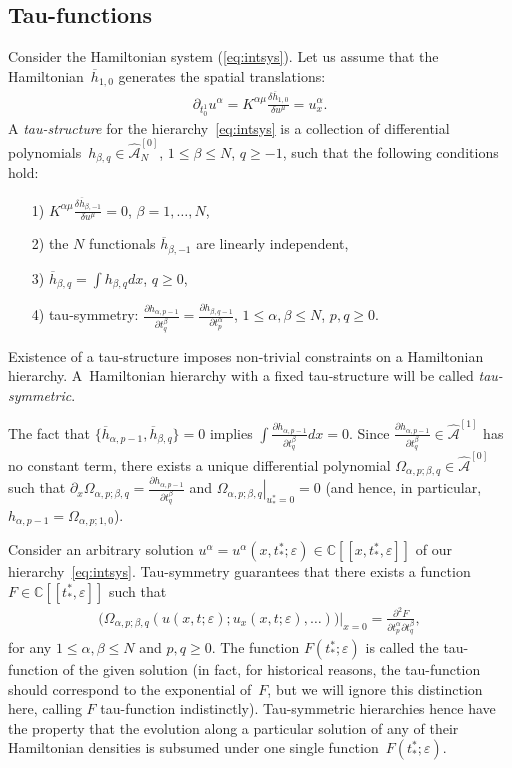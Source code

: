 \documentclass[pdftex]{sigma}
\numberwithin{equation}{section}
\newcommand{\mbC}{\mathbb C}
\newcommand{\oh}{\overline h}
\def\d{{\partial}}
\newcommand{\<}{\left<}
\renewcommand{\>}{\right>}
\newcommand{\eps}{\varepsilon}
\newcommand{\hcA}{\widehat{\mathcal A}}
\begin{document}
\subsection{Tau-functions}\label{section:tau} Consider the Hamiltonian system (\ref{eq:intsys}). Let us assume that the Hamiltonian~$\oh_{1,0}$ generates the spatial translations:
\begin{gather*}
\d_{t^1_0}u^\alpha=K^{\alpha\mu}\frac{\delta\oh_{1,0}}{\delta u^\mu}=u^\alpha_x.
\end{gather*}
A {\it tau-structure} for the hierarchy~\eqref{eq:intsys} is a collection of dif\/ferential polynomials~$h_{\beta,q}\in\hcA^{[0]}_N$, $1\le\beta\le N$, $q\ge -1$, such that the following conditions hold:
\begin{enumerate}\itemsep=0pt
\item[1)] $K^{\alpha\mu}\frac{\delta\oh_{\beta,-1}}{\delta u^\mu}=0$, $\beta=1,\dots,N$,

\item[2)] the $N$ functionals $\oh_{\beta,-1}$ are linearly independent,

\item[3)] $\oh_{\beta,q}=\int h_{\beta,q}dx$, $q\ge 0$,

\item[4)] tau-symmetry:
$\frac{\d h_{\alpha,p-1}}{\d t^\beta_q}=\frac{\d h_{\beta,q-1}}{\d t^\alpha_p}$, $1\le\alpha,\beta\le N$, $p,q\ge 0$.
\end{enumerate}

Existence of a tau-structure imposes non-trivial constraints on a Hamiltonian hierarchy. A~Hamiltonian hierarchy with a f\/ixed tau-structure will be called {\it tau-symmetric}.

The fact that $\{\oh_{\alpha,p-1},\oh_{\beta,q}\}=0$ implies $\int\frac{\d h_{\alpha,p-1}}{\d t^\beta_q}dx=0$. Since $\frac{\d h_{\alpha,p-1}}{\d t^\beta_q} \in \hcA^{[1]}$ has no constant term, there exists a unique dif\/ferential polynomial $\Omega_{\alpha,p;\beta,q}\in\hcA^{[0]}$ such that $\d_x \Omega_{\alpha,p;\beta,q} = \frac{\d h_{\alpha,p-1}}{\d t^\beta_q}$ and $\left.\Omega_{\alpha,p;\beta,q}\right|_{u^*_*=0} = 0$ (and hence, in particular, $h_{\alpha,p-1} = \Omega_{\alpha,p;1,0}$).

Consider an arbitrary solution $u^\alpha=u^\alpha(x,t^*_*;\eps)\in\mbC[[x,t^*_*,\eps]]$ of our hierarchy~\eqref{eq:intsys}. Tau-symmetry guarantees that there exists a function $F\in\mbC[[t^*_*,\eps]]$ such that
\begin{gather*}
\big(\Omega_{\alpha,p;\beta,q}(u(x,t;\eps);u_x(x,t;\eps),\dots)\big)\big|_{x=0}=\frac{\d^2 F}{\d t^\alpha_p\d t^\beta_q},
\end{gather*} for any $1\le\alpha,\beta\le N$ and $p,q\ge 0$. The function $F(t^*_*;\eps)$ is called the tau-function of the given solution (in fact, for historical reasons, the tau-function should correspond to the exponential of~$F$, but we will ignore this distinction here, calling $F$ tau-function indistinctly). Tau-symmetric hierarchies hence have the property that the evolution along a particular solution of any of their Hamiltonian densities is subsumed under one single function~$F(t^*_*;\eps)$.
\end{document}
